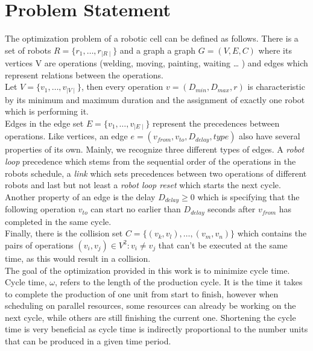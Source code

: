 \chapter{Problem Statement}
\label{ch:problem_statement}
\graphicspath{ {chapters/Problem_Statement/} }

The optimization problem of a robotic cell can be defined as follows.
There is a set of robots $R = \{ r_1, \dots, r_{\mid R \mid }\} $ and a graph a graph $ G = (V, E, C) $ where its vertices V are operations (welding, moving, painting, waiting \dots
) and edges which represent relations between the operations. \\

Let $V = \{v_1, \dots, v_{\mid V \mid }\}$, then every operation $v = (D_{min}, D_{max}, r)$ is characteristic by its minimum and maximum duration and the assignment of exactly one robot which is performing it.\\

Edges in the edge set $E = \{v_1, \dots, v_{\mid E \mid }\}$ represent the precedences between operations. 
Like vertices, an edge $e = (v_{from}, v_{to}, D_{delay}, type)$ also have several properties of its own. 
Mainly, we recognize three different types of edges. 
A \emph{robot loop} precedence which stems from the sequential order of the operations in the robots schedule, a \emph{link} which sets precedences between two operations of different robots and last but not least a \emph{robot loop reset} which starts the next cycle. 
Another property of an edge is the delay $D_{delay} \geq 0$ which is specifying that the following operation $v_{to}$ can start no earlier than $D_{delay}$ seconds after $v_{from}$ has completed in the same cycle. \\

Finally, there is the collision set $C = \{ (v_k, v_l), \dots, (v_m, v_n) \}$ which contains the pairs of operations $(v_i, v_j) \in V^2 : v_i \neq v_j$ that can't be executed at the same time, as this would result in a collision. \\

The goal of the optimization provided in this work is to minimize cycle time. 
Cycle time, $\omega$, refers to the length of the production cycle. 
It is the time it takes to complete the production of one unit from start to finish, however when scheduling on parallel resources, some resources can already be working on the next cycle, while others are still finishing the current one.
Shortening the cycle time is very beneficial as cycle time is indirectly proportional to the number units that can be produced in a given time period.

